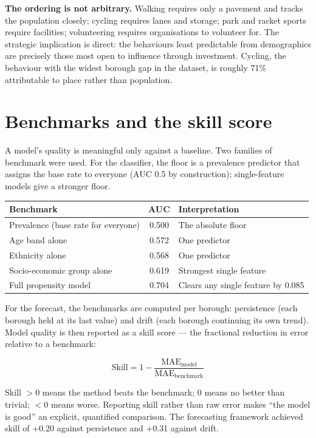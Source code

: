 \documentclass[ %
                    author={Ashrey Ashrey, Sanya Kapoor, Trisha Sharma, Yash Bhooshan Pandloskar},
                supervisor={Dr. Dalila O’Grady},
                    degree={MSc},
                     title={Using machine learning to forecast physical activity participation, volunteering and activity patterns in London},
                  subtitle={},
                      type={},
                      year={2021}]{dissertation}
\begin{document}
\noindent
\textbf{The ordering is not arbitrary.} Walking requires only a pavement and tracks the population closely; cycling requires lanes and storage; park and racket sports require facilities; volunteering requires organisations to volunteer for. The strategic implication is direct: the behaviours least predictable from demographics are precisely those most open to influence through investment. Cycling, the behaviour with the widest borough gap in the dataset, is roughly 71\% attributable to place rather than population.

\section{Benchmarks and the skill score}

\noindent
A model's quality is meaningful only against a baseline. Two families of benchmark were used. For the classifier, the floor is a prevalence predictor that assigns the base rate to everyone (AUC 0.5 by construction); single-feature models give a stronger floor.

\begin{table}[!htb]
\centering
\begin{tabular}{lcl}
\toprule
\textbf{Benchmark} & \textbf{AUC} & \textbf{Interpretation} \\
\midrule
Prevalence (base rate for everyone) & 0.500 & The absolute floor \\
Age band alone & 0.572 & One predictor \\
Ethnicity alone & 0.568 & One predictor \\
Socio-economic group alone & 0.619 & Strongest single feature \\
Full propensity model & 0.704 & Clears any single feature by 0.085 \\
\bottomrule
\end{tabular}
\end{table}

For the forecast, the benchmarks are computed per borough: persistence (each borough held at its last value) and drift (each borough continuing its own trend). Model quality is then reported as a skill score --- the fractional reduction in error relative to a benchmark:

\[
\mathrm{Skill}
=
1-
\frac{\mathrm{MAE}_{\mathrm{model}}}
{\mathrm{MAE}_{\mathrm{benchmark}}}
\]

Skill \(>0\) means the method beats the benchmark; 0 means no better than trivial; \(<0\) means worse. Reporting skill rather than raw error makes ``the model is good'' an explicit, quantified comparison. The forecasting framework achieved skill of +0.20 against persistence and +0.31 against drift.
\end{document}
